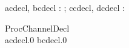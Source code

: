 \begin{circus}
 \circchannel acdecl, bcdecl : \nat; ccdecl, dcdecl : \nat \\
\end{circus}

\begin{circus}
 \circprocess ProcChannelDecl \circdef \circbegin \\
 \circspot acdecl.0 \then bcdecl.0 
      \then \Skip \\
 \circend
\end{circus}
